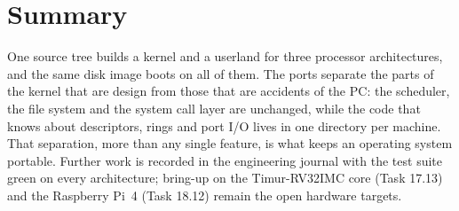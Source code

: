 \documentclass[11pt,a4paper]{article}
\begin{document}
\section{Summary}

One source tree builds a kernel and a userland for three processor architectures, and the same disk image boots on
all of them. The ports separate the parts of the kernel that are design from those that are accidents of the PC: the
scheduler, the file system and the system call layer are unchanged, while the code that knows about descriptors,
rings and port I/O lives in one directory per machine. That separation, more than any single feature, is what keeps
an operating system portable. Further work is recorded in the engineering journal with the test suite green on every
architecture; bring-up on the Timur-RV32IMC core (Task 17.13) and the Raspberry Pi~4 (Task 18.12) remain the open
hardware targets.

\booklegend
\portlegend
\end{document}

